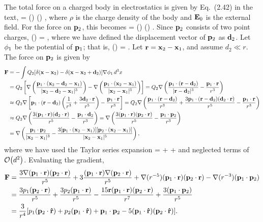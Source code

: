 \begin{solution}
	The total force on a charged body in electrostatics is given by Eq.~(2.42) in the text,
	\beq
		\vF = \int \rho(\vx) \vEo(\vx) \dcx,
	\eeq
	where $\rho$ is the charge density of the body and $\mathbf{E}_0$ is the external field.  For the force on $\mathbf{p}_2$, this becomes
	\beq
		\vF = \int \rhow(\vx) \vEo(\vx) \dcx.
	\eeq
	Since $\mathbf{p}_2$ consists of two point charges,
	\beqn \label{rho1}
		\rhow(\vx) = \Qw [\delta(\vx - \vxw) - \delta(\vx - \vxw + \vdw)],
	\eeqn
	where we have defined the displacement vector of $\mathbf{p}_2$ as $\mathbf{d}_2$.  Let $\phi_1$ be the potential of $\mathbf{p}_1$; that is,
	\beqn \label{phi1}
		\phiq(\vx) = .
	\eeqn
	Let $\mathbf{r} = \mathbf{x}_2 - \mathbf{x}_1$, and assume $d_2 \ll r$.  The force on $\mathbf{p}_2$ is given by
	\begin{align*}
		\mathbf{F} &= -\int Q_2 [\delta(\mathbf{x} - \mathbf{x}_2) - \delta(\mathbf{x} - \mathbf{x}_2 + \mathbf{d}_2)] \nabla \phi_1 \dd[3]{x} \\
		&= Q_2 \left[ \nabla \left( \frac{\mathbf{p}_1 \cdot (\mathbf{x}_2 - \mathbf{d}_2 - \mathbf{x}_1)}{|\mathbf{x}_2 - \mathbf{d}_2 - \mathbf{x}_1|^3} \right) - \nabla \left( \frac{\mathbf{p}_1 \cdot (\mathbf{x}_2 - \mathbf{x}_1)}{|\mathbf{x}_2 - \mathbf{x}_1|^3} \right) \right]
		= Q_2 \nabla \left( \frac{\mathbf{p}_1 \cdot (\mathbf{r} - \mathbf{d}_2)}{|\mathbf{r} - \mathbf{d}_2|^3} - \frac{\mathbf{p}_1 \cdot \mathbf{r}}{r^3} \right) \\
		&\approx Q_2 \nabla \left[ \mathbf{p}_1 \cdot (\mathbf{r} - \mathbf{d}_2) \left( \frac{1}{r^3} + \frac{3 \mathbf{d}_2 \cdot \mathbf{r}}{r^5} \right) - \frac{\mathbf{p}_1 \cdot \mathbf{r}}{r^3} \right]
		= Q_2 \nabla \left( \frac{\mathbf{p}_1 \cdot (\mathbf{r} - \mathbf{d}_2)}{r^3} + \frac{3 \mathbf{p}_1 \cdot (\mathbf{r} - \mathbf{d}_2) (\mathbf{d}_2 \cdot \mathbf{r})}{r^5} - \frac{\mathbf{p}_1 \cdot \mathbf{r}}{r^3} \right) \\
		&\approx Q_2 \nabla \left( \frac{3(\mathbf{p}_1 \cdot \mathbf{r})(\mathbf{d}_2 \cdot \mathbf{r})}{r^5} - \frac{\mathbf{p}_1 \cdot \mathbf{d}_2}{r^3} \right)
		= \nabla \left( \frac{3(\mathbf{p}_1 \cdot \mathbf{r})(\mathbf{p}_2 \cdot \mathbf{r})}{r^5} - \frac{\mathbf{p}_1 \cdot \mathbf{p}_2}{r^3} \right) \\
		&= \nabla \left( \frac{\mathbf{p}_1 \cdot \mathbf{p}_2}{|\mathbf{x}_2 - \mathbf{x}_1|^3} - \frac{3[\mathbf{p}_1 \cdot (\mathbf{x}_2 - \mathbf{x}_1)][\mathbf{p}_2 \cdot (\mathbf{x}_2 - \mathbf{x}_1)]}{|\mathbf{x}_2 - \mathbf{x}_1|^5} \right),
	\end{align*}
	where we have used the Taylor series expansion
	\beq
		 =  +  + \cdots
	\eeq
	and neglected terms of $\order{d^2}$.  Evaluating the gradient,
	\begin{align*}
		\mathbf{F} &= \frac{3 \nabla(\mathbf{p}_1 \cdot \mathbf{r}) (\mathbf{p}_2 \cdot \mathbf{r})}{r^5} + 3 \frac{(\mathbf{p}_1 \cdot \mathbf{r}) \nabla(\mathbf{p}_2 \cdot \mathbf{r})}{r^5} + \nabla(r^{-5}) (\mathbf{p}_1 \cdot \mathbf{r})(\mathbf{p}_2 \cdot \mathbf{r}) - \nabla(r^{-3}) (\mathbf{p}_1 \cdot \mathbf{p}_2) \\
		&= \frac{3 p_1 (\mathbf{p}_2 \cdot \mathbf{r})}{r^5} + \frac{3 p_2 (\mathbf{p}_1 \cdot \mathbf{r})}{r^5} - \frac{15 \mathbf{r} (\mathbf{p}_1 \cdot \mathbf{r}) (\mathbf{p}_2 \cdot \mathbf{r})}{r^7} + \frac{3 (\mathbf{p}_1 \cdot \mathbf{p}_2)}{r^5} \\
		&= \frac{3}{r^4} [ p_1 (\mathbf{p}_2 \cdot \mathbf{\hat{r}}) + p_2 (\mathbf{p}_1 \cdot \mathbf{\hat{r}}) + \mathbf{p}_1 \cdot \mathbf{p}_2 - 5 (\mathbf{p}_1 \cdot \mathbf{\hat{r}}) (\mathbf{p}_2 \cdot \mathbf{\hat{r}}) ].
	\end{align*}
\end{solution}
\vfix


